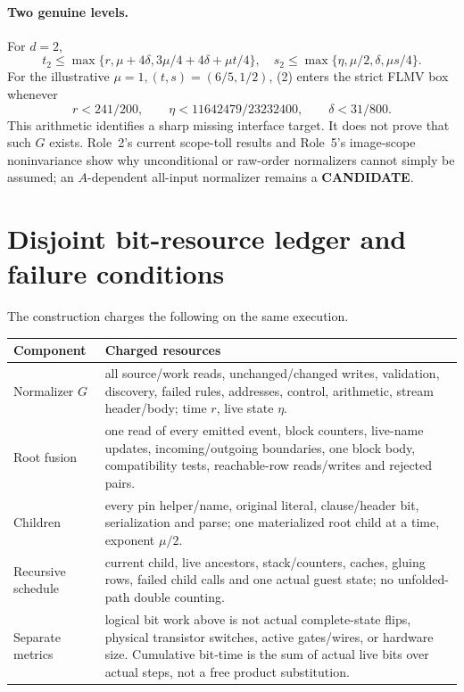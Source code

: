 \documentclass[11pt]{article}
\begin{document}
\paragraph{Two genuine levels.}
For \(d=2\),
\[
t_2\le\max\{r,\mu+4\delta,3\mu/4+4\delta+\mu t/4\},
\quad
s_2\le\max\{\eta,\mu/2,\delta,\mu s/4\}.
\tag{2}
\]
For the illustrative \(\mu=1,(t,s)=(6/5,1/2)\), (2) enters the strict
FLMV box whenever
\[
r<241/200,\qquad \eta<11642479/23232400,\qquad
\delta<31/800.
\tag{3}
\]
This arithmetic identifies a sharp missing interface target.  It does not
prove that such \(G\) exists.  Role~2's current scope-toll results and
Role~5's image-scope noninvariance show why unconditional or raw-order
normalizers cannot simply be assumed; an \(A\)-dependent all-input
normalizer remains a \textbf{CANDIDATE}.

\section{Disjoint bit-resource ledger and failure conditions}
The construction charges the following on the same execution.
\begin{center}\small
\begin{tabular}{p{.25\linewidth}p{.66\linewidth}}
\toprule
Component & Charged resources\\\midrule
Normalizer \(G\) & all source/work reads, unchanged/changed writes,
validation, discovery, failed rules, addresses, control, arithmetic,
stream header/body; time \(r\), live state \(\eta\).\\
Root fusion & one read of every emitted event, block counters, live-name
updates, incoming/outgoing boundaries, one block body, compatibility tests,
reachable-row reads/writes and rejected pairs.\\
Children & every pin helper/name, original literal, clause/header bit,
serialization and parse; one materialized root child at a time, exponent
\(\mu/2\).\\
Recursive schedule & current child, live ancestors, stack/counters, caches,
gluing rows, failed child calls and one actual guest state; no unfolded-path
double counting.\\
Separate metrics & logical bit work above is not actual complete-state flips,
physical transistor switches, active gates/wires, or hardware size.
Cumulative bit-time is the sum of actual live bits over actual steps, not a
free product substitution.\\\bottomrule
\end{tabular}
\end{center}
\end{document}
